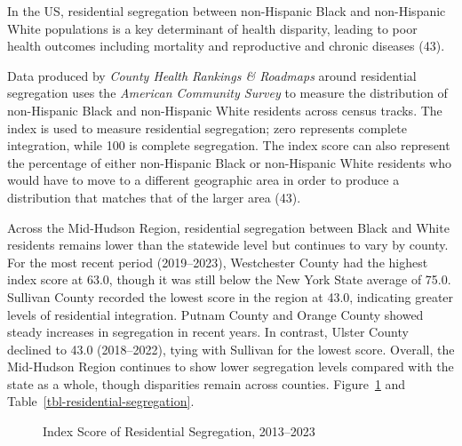 \documentclass[
  english,
  letterpaper,
]{report}
\begin{document}
In the US, residential segregation between non-Hispanic Black and
non-Hispanic White populations is a key determinant of health disparity,
leading to poor health outcomes including mortality and reproductive and
chronic diseases (43).

Data produced by \emph{County Health Rankings \& Roadmaps} around
residential segregation uses the \emph{American Community Survey} to
measure the distribution of non-Hispanic Black and non-Hispanic White
residents across census tracks. The index is used to measure residential
segregation; zero represents complete integration, while 100 is complete
segregation. The index score can also represent the percentage of either
non-Hispanic Black or non-Hispanic White residents who would have to
move to a different geographic area in order to produce a distribution
that matches that of the larger area (43).

Across the Mid-Hudson Region, residential segregation between Black and
White residents remains lower than the statewide level but continues to
vary by county. For the most recent period (2019--2023), Westchester
County had the highest index score at 63.0, though it was still below
the New York State average of 75.0. Sullivan County recorded the lowest
score in the region at 43.0, indicating greater levels of residential
integration. Putnam County and Orange County showed steady increases in
segregation in recent years. In contrast, Ulster County declined to 43.0
(2018--2022), tying with Sullivan for the lowest score. Overall, the
Mid-Hudson Region continues to show lower segregation levels compared
with the state as a whole, though disparities remain across counties.
Figure~\ref{fig-residential-segregation} and
Table~\ref{tbl-residential-segregation}.

\begin{figure}


\caption{\label{fig-residential-segregation}Index Score of Residential
Segregation, 2013--2023}

\end{figure}%
\end{document}
